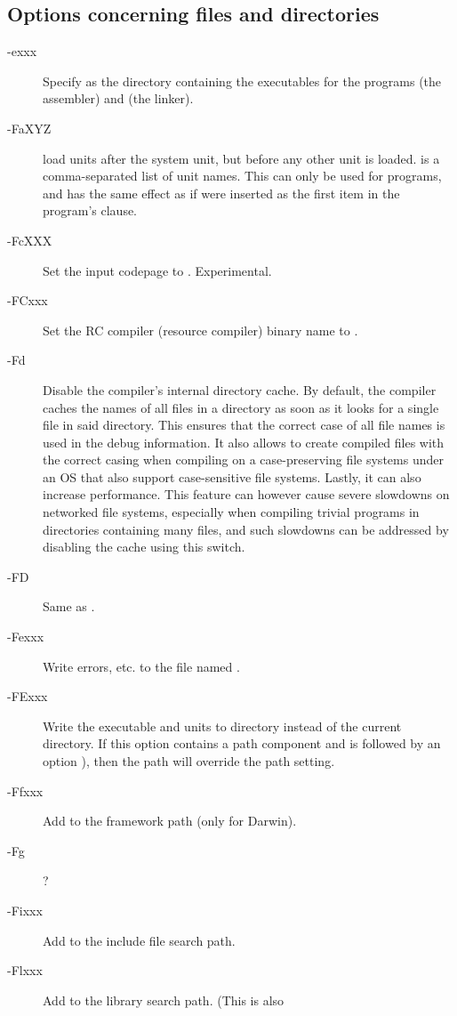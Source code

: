 \subsection{Options concerning files and directories}
\begin{description}
\item [-exxx] Specify  as the directory containing the
executables for the programs  (the assembler) and  (the linker).
\item[-FaXYZ] load units  after the system unit, but before any other 
unit is loaded.  is a comma-separated list of unit names. This can only be used
for programs, and has the same effect as if  were inserted as the
first item in the program's  clause.
\item[-FcXXX] Set the input codepage to . Experimental.
\item[-FCxxx] Set the RC compiler (resource compiler) binary name to .
\item[-Fd] Disable the compiler's internal directory cache. By default, the compiler caches the
names of all files in a directory as soon as it looks for a single file in said directory. This ensures
that the correct case of all file names is used in the debug information. 
It also allows to create compiled files with the correct casing when compiling on a case-preserving 
file systems under an OS that also support case-sensitive file systems.
Lastly, it can also increase performance. This feature can however cause severe slowdowns
on networked file systems, especially when compiling trivial programs in directories containing many
files, and such slowdowns can be addressed by disabling the cache using this switch.
\item [-FD] Same as .
\item [-Fexxx] Write errors, etc. to the file named .
\item [-FExxx] Write the executable and units to directory  
instead of the current directory. If this option contains a path component
and is followed by an option ), then the  path will override 
the  path setting.
\item [-Ffxxx] Add  to the framework path (only for Darwin).
\item [-Fg] ?
\item [-Fixxx] Add  to the include file search path.
\item [-Flxxx] Add  to the library search path. (This is also 

\end{description}
